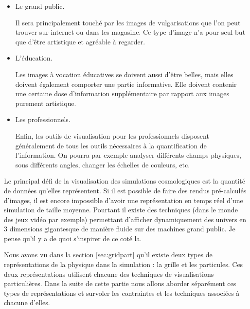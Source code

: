 \begin{itemize}
\item Le grand public. 
 
Il sera principalement touché par les images de vulgarisations que l'on peut trouver sur internet ou dans les magasine.
Ce type d'image n'a pour seul but que d'être artistique et agréable à regarder.

\item L'éducation.

Les images à vocation éducatives se doivent aussi d'être belles, mais elles doivent également comporter une partie informative.
Elle doivent contenir une certaine dose d'information supplémentaire par rapport aux images purement artistique.

\item Les professionnels.

Enfin, les outils de visualisation pour les professionnels disposent généralement de tous les outils nécessaires à la quantification de l'information.
On pourra par exemple analyser différents champs physiques, sous différents angles, changer les échelles de couleurs, etc.
\end{itemize}





Le principal défi de la visualisation des simulations cosmologiques est la quantité de données qu'elles représentent.
Si il est possible de faire des rendus pré-calculés d'images, il est encore impossible d'avoir une représentation en temps réel d'une simulation de taille moyenne.
Pourtant il existe des techniques (dans le monde des jeux vidéo par exemple) permettant d'afficher dynamiquement des univers en 3 dimensions gigantesque de manière fluide sur des machines grand public.
Je pense qu'il y a de quoi s'inspirer de ce coté la.

Nous avons vu dans la section \ref{sec:gridpart} qu'il existe deux types de représentations de la physique dans la simulation : la grille et les particules.
Ces deux représentations utilisent chacune des techniques de visualisations particulières.
Dans la suite de cette partie nous allons aborder séparément ces types de représentations et survoler les contraintes et les techniques associées à chacune d'elles.

